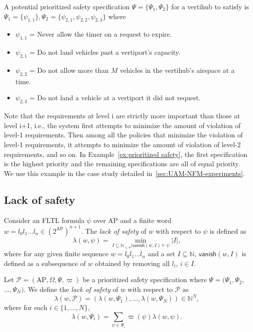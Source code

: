 \begin{eg}\label{ex:prioritized safety}
 A potential prioritized safety specification $\Psi = \{\Psi_1,\Psi_2\}$ for a vertihub to satisfy is $\Psi_1 = \{\psi_{1,1}\}, \Psi_2 = \{\psi_{2,1}, \psi_{2,2}, \psi_{2,3}\}$ where %
\begin{itemize}
    \item $\psi_{1,1}$ = Never allow the timer on a request to expire. 
    \item  $\psi_{2,1}$ = Do not land vehicles past a vertiport's capacity.
    \item  $\psi_{2,2}$ = Do not allow more than $M$ vehicles in the vertihub's airspace at a time.
    \item  $\psi_{2,3}$ = Do not land a vehicle at a vertiport it did not request.
\end{itemize}
\end{eg} 

Note that the requirements at level i are strictly more important than those at level i+1, i.e., the system first attempts to minimize the amount of violation of level-1 requirements. Then among all the policies that minimize the violation of level-1 requirements, it attempts to minimize the amount of violation of level-2 requirements, and so on. In Example~\ref{ex:prioritized safety}, the first specification is the highest priority and the remaining specifications are all of equal priority. We use this example in the case study detailed in~\ref{sec:UAM-NFM-experiments}.

\subsection{Lack of safety}
Consider an FLTL formula $\psi$ over $\text{AP}$ and a finite word $w = l_0 l_1 \ldots l_n \in (2^{\text{AP}})^{n+1}$.
The \emph{lack of safety} of $w$ with respect to $\psi$ is defined as
\begin{equation}
        \lambda(w, \psi) = \min_{I \subseteq \mathbb{N}_{\leq n} |
        \mathsf{vanish}(w, I) \models \psi}
        |I|,
\end{equation}
where for any given finite sequence $w = l_0 l_1 \ldots l_n$
and a set $I \subseteq \mathbb{N}$,
$\mathsf{vanish}(w, I)$ is defined as a subsequence of $w$ obtained by
removing all $l_i$, $i \in I$.

Let $\mathcal{P} = (\text{AP}, \Omega, \Psi, \varpi)$ be a prioritized safety specification where $\Psi = (\Psi_1, \Psi_2,$ $\ldots, \Psi_N)$.
We define the \emph{lack of safety} of $w$ with respect to $\mathcal{P}$ as
\begin{equation}
        \lambda(w, \mathcal{P}) = (\lambda(w, \Psi_1), \ldots, \lambda(w, \Psi_N))
        \in \mathbb{N}^{N},
\end{equation}
where for each $i \in \{1, \ldots, N\}$,
\begin{equation}
        \lambda(w, \Psi_i) =
        \sum_{\psi \in \Psi_i} \varpi(\psi) \lambda(w, \psi).
\end{equation}

